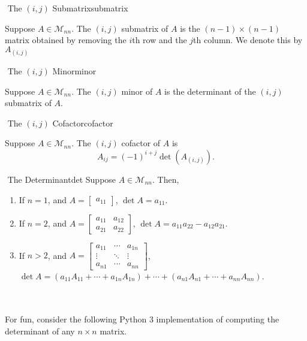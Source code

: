         \begin{definition}{\Stop\,\,The \((i,j)\) Submatrix}{submatrix}

            Suppose \(A\in\mathcal{M}_{nn}\). The \((i,j)\) submatrix of \(A\) is the \((n-1)\times(n-1)\) matrix obtained by removing the \(i\)th row and the \(j\)th column. We denote this by \(A_{(i,j)}\) 
            
        \end{definition}
        \begin{definition}{\Stop\,\,The \((i,j)\) Minor}{minor}

            Suppose \(A\in\mathcal{M}_{nn}\). The \((i,j)\) minor of \(A\) is the determinant of the \((i,j)\) submatrix of \(A\).
            
        \end{definition}
        \begin{definition}{\Stop\,\,The \((i,j)\) Cofactor}{cofactor}

            Suppose \(A\in\mathcal{M}_{nn}\). The \((i,j)\) cofactor of \(A\) is
            \begin{equation*}
                A_{ij}=(-1)^{i+j}\det (A_{(i,j)}).
            \end{equation*}
            
        \end{definition}
        \begin{definition}{\Stop\,\,The Determinant}{det}
            Suppose \(A\in\mathcal{M}_{nn}\). Then,
            \begin{enumerate}
                \item If \(n=1\), and \(A=\begin{bmatrix} a_{11} \end{bmatrix}\), \(\det A = a_{11}\).
                \item If \(n=2\), and \(A=\begin{bmatrix} a_{11} & a_{12} \\ a_{21} & a_{22} \end{bmatrix}\), \(\det A = a_{11}a_{22}-a_{12}a_{21}\).
                \item If \(n>2\), and \(A=\begin{bmatrix} a_{11} & \cdots & a_{1n} \\ \vdots & \ddots & \vdots \\ a_{n1} & \cdots & a_{nn} \end{bmatrix}\), \(\det A = (a_{11}A_{11}+\cdots+a_{1n}A_{1n})+\cdots+(a_{n1}A_{n1}+\cdots+a_{nn}A_{nn})\).
            \end{enumerate}
        \end{definition}
        \pagebreak
        \vphantom
        \\
        \\
        For fun, consider the following Python 3 implementation of computing the determinant of any \(n\times n\) matrix.
        
        
